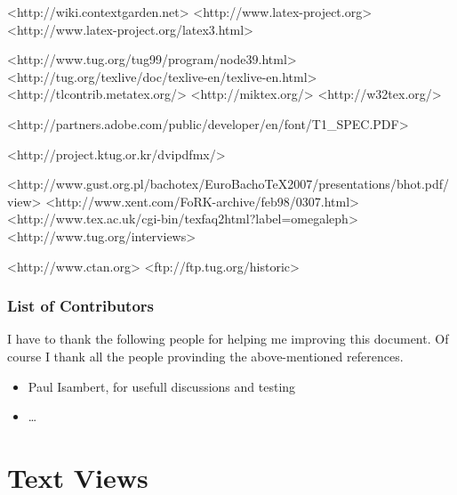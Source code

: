 \documentclass{scrartcl}
\begin{document}
	<http://wiki.contextgarden.net>
	<http://www.latex-project.org>
	<http://www.latex-project.org/latex3.html>
	

	<http://www.tug.org/tug99/program/node39.html>
	<http://tug.org/texlive/doc/texlive-en/texlive-en.html>
	<http://tlcontrib.metatex.org/>
	<http://miktex.org/>
	<http://w32tex.org/>

	<http://partners.adobe.com/public/developer/en/font/T1_SPEC.PDF>

	<http://project.ktug.or.kr/dvipdfmx/>
	
	  <http://www.gust.org.pl/bachotex/EuroBachoTeX2007/presentations/bhot.pdf/view>
	<http://www.xent.com/FoRK-archive/feb98/0307.html>
	<http://www.tex.ac.uk/cgi-bin/texfaq2html?label=omegaleph>
	<http://www.tug.org/interviews>
	
	<http://www.ctan.org>
	<ftp://ftp.tug.org/historic>

\clearpage
\section{List of Contributors}
I have to thank the following people for helping me improving this document. Of course I thank all the people provinding the above-mentioned references. 

\begin{itemize}
\item Paul Isambert, for usefull discussions and testing
\item …
\end{itemize}
\part*{Text Views}  %
\label{sec:text}
\end{document}
